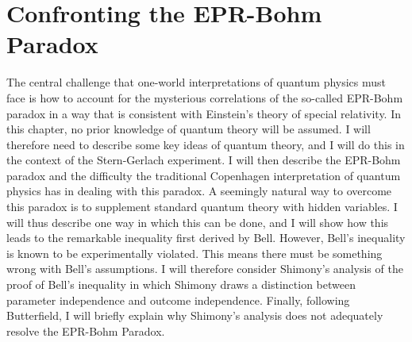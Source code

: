 \begin{comment}
    \section{Introduction}
    \emph{}
    
    Common sense is very often underrated. This is especially so in the light of modern physics. Not infrequently, one hears people claim that modern physics shows us that reality is fundamentally weird and that we must discard our naïve common sense intuitions. Now perhaps these people are right, but if we are to accept their claims, they ought to have really compelling reasons. The usual response to an argument that results in weird or seemingly absurd conclusions is to question the argument's premises or examine whether the argument is logically valid. 
\end{comment}
    \chapter{Confronting the EPR-Bohm Paradox\label{BellChapter}}
   
    
    The central challenge that one-world interpretations of quantum physics must face is how to account for the mysterious correlations of the so-called EPR-Bohm paradox in a way that is consistent with Einstein's theory of special relativity.  In this chapter, no  prior knowledge of quantum theory will be assumed. I will therefore need to describe some key ideas of quantum theory, and I will do this in the context of the  Stern-Gerlach experiment. 
    I will then describe the EPR-Bohm paradox and the difficulty the traditional Copenhagen interpretation of quantum physics has in dealing with this paradox. A seemingly natural way to overcome this paradox is to supplement standard quantum theory with hidden variables. I will thus describe one way in which this can be done, and I will show how this leads to the remarkable inequality first derived by Bell. However, Bell's inequality is known to be experimentally violated. This means there must be something wrong with Bell's assumptions. I will therefore consider Shimony's analysis of the proof of Bell's inequality in which Shimony draws a distinction between parameter independence and outcome independence. Finally, following Butterfield, I will briefly explain why Shimony's analysis does not adequately resolve the EPR-Bohm Paradox. 


    